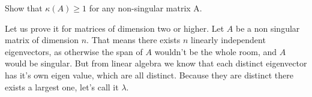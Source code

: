 \documentclass[10pt]{article}
\begin{document}
\begin{exercise}[6]  \label{exe:6}
Show that \(\kappa(A) \geq 1\) for any non-singular matrix A.
\end{exercise}
\begin{solution}[6]  \label{sol:6}
Let us prove it for matrices of dimension two or higher.
Let \(A\) be a non singular matrix of dimension \(n\). That means there exists
\(n\) linearly independent eigenvectors, as otherwise the span of \(A\)
wouldn't be the whole room, and \(A\) would be singular. But from
linear algebra we know that each distinct eigenvector has it's own
eigen value, which are all distinct. Because they are distinct there exists
a largest one, let's call it \(\lambda\).
\end{solution}
\end{document}
